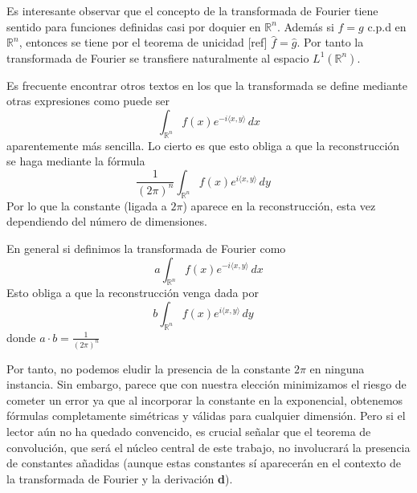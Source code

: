 \begin{observacion}
Es interesante observar que el concepto de la transformada de Fourier tiene sentido para funciones definidas casi por doquier en $\mathbb{R}^n$.
Además si $f=g$ c.p.d en $\mathbb{R}^n$, entonces se tiene por el teorema de unicidad [ref] $\widehat{f}=\widehat{g}$. Por tanto la transformada de Fourier se transfiere naturalmente al espacio $L^1(\mathbb{R}^n)$.
\end{observacion}

\begin{observacion}
Es frecuente encontrar otros textos en los que la transformada se define mediante otras expresiones como puede ser 
\begin{equation}\label{eq:trans2}
    \int_{\mathbb{R}^n} f(x) e^{-i \langle x, y \rangle} \, dx 
\end{equation}
aparentemente más sencilla. Lo cierto es que esto obliga a que la reconstrucción se haga mediante la fórmula 
\begin{equation}
   \frac{1}{(2 \pi)^n} \int_{\mathbb{R}^n} f(x) e^{i \langle x, y \rangle} \, dy \quad 
\end{equation}
Por lo que la constante (ligada  a $2 \pi$) aparece en la reconstrucción, esta vez dependiendo del número de dimensiones.

En general si definimos la transformada de Fourier como 
\begin{equation}
    a\int_{\mathbb{R}^n} f(x) e^{-i \langle x, y \rangle} \, dx 
\end{equation}
Esto obliga a que la reconstrucción venga dada por 
\begin{equation}
   b\int_{\mathbb{R}^n} f(x) e^{i \langle x, y \rangle} \, dy \quad 
\end{equation}
donde $a \cdot b = \frac{1}{(2\pi)^n}$

\noindent Por tanto, no podemos eludir la presencia de la constante $2 \pi$ en ninguna instancia. Sin embargo, parece que con nuestra elección minimizamos el riesgo de cometer un error ya que al incorporar la constante en la exponencial, obtenemos fórmulas completamente simétricas y válidas para cualquier dimensión. Pero si el lector aún no ha quedado convencido, es crucial señalar que el teorema de convolución, que será el núcleo central de este trabajo, no involucrará la presencia de constantes añadidas (aunque estas constantes sí aparecerán en el contexto de la transformada  de Fourier y la derivación \textbf{d}).
\end{observacion}

